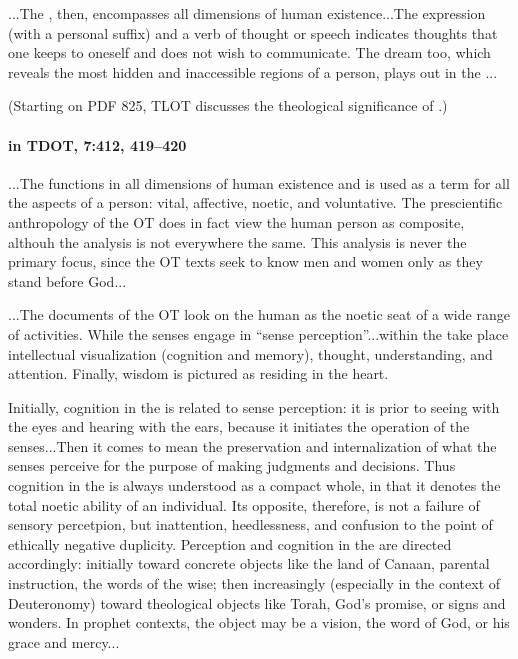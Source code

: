 			...The , then, encompasses all dimensions of human existence...The expression  (with a personal suffix) and a verb of thought or speech indicates thoughts that one keeps to oneself and does not wish to communicate. The dream too, which reveals the most hidden and inaccessible regions of a person, plays out in the ...
			
			(Starting on PDF 825, TLOT discusses the theological significance of .)
			
		\paragraph{\texorpdfstring{}{} in TDOT, 7:412, 419--420}
			\label{HEART-TDOT}
			
			...The  functions in all dimensions of human existence and is used as a term for all the aspects of a person: vital, affective, noetic, and voluntative. The prescientific anthropology of the OT does in fact view the human person as composite, althouh the analysis is not everywhere the same. This analysis is never the primary focus, since the OT texts seek to know men and women only as they stand before God...
			
			...The documents of the OT look on the human  as the noetic seat of a wide range of activities. While the senses engage in ``sense perception''...within the  take place intellectual visualization (cognition and memory), thought, understanding, and attention. Finally, wisdom is pictured as residing in the heart.
			
			Initially, cognition in the  is related to sense perception: it is prior to seeing with the eyes and hearing with the ears, because it initiates the operation of the senses...Then it comes to mean the preservation and internalization of what the senses perceive for the purpose of making judgments and decisions. Thus cognition in the  is always understood as a compact whole, in that it denotes the total noetic ability of an individual. Its opposite, therefore, is not a failure of sensory percetpion, but inattention, heedlessness, and confusion to the point of ethically negative duplicity. Perception and cognition in the  are directed accordingly: initially toward concrete objects like the land of Canaan, parental instruction, the words of the wise; then increasingly (especially in the context of Deuteronomy) toward theological objects like Torah, God's promise, or signs and wonders. In prophet contexts, the object may be a vision, the word of God, or his grace and mercy...
			
